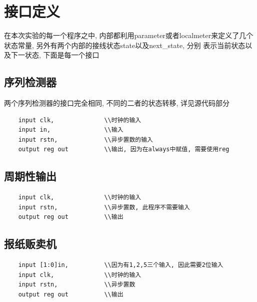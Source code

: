 \documentclass[fontset=windows,12pt]{article}
\begin{document}
\section{接口定义}
    在本次实验的每一个程序之中, 内部都利用parameter或者localmeter来定义了几个状态常量, 另外有两个内部的接线状态state以及next\_state, 分别
    表示当前状态以及下一状态, 下面是每一个接口
    \subsection{序列检测器}
        两个序列检测器的接口完全相同, 不同的二者的状态转移, 详见源代码部分
        {\setmainfont{Courier New Bold}                               
        \begin{lstlisting}
    input clk,              \\时钟的输入
    input in,               \\输入
    input rstn,             \\异步置数的输入
    output reg out          \\输出, 因为在always中赋值, 需要使用reg
        \end{lstlisting}}
   \subsection{周期性输出}
        {\setmainfont{Courier New Bold}                               
        \begin{lstlisting}
    input clk,              \\时钟的输入
    input rstn,             \\异步置数, 此程序不需要输入
    output reg out          \\输出
        \end{lstlisting}}
    \subsection{报纸贩卖机}
    {\setmainfont{Courier New Bold}                               
    \begin{lstlisting}
    input [1:0]in,          \\因为有1,2,5三个输入, 因此需要2位输入
    input clk,              \\时钟的输入
    input rstn,             \\异步置数
    output reg out          \\输出
    \end{lstlisting}}
\end{document}
